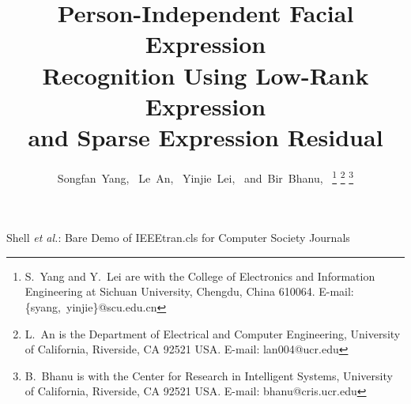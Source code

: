 \documentclass[journal]{IEEEtran}
\begin{document}
%
\title{Person-Independent Facial Expression  \\ Recognition Using Low-Rank Expression \\ and Sparse Expression Residual}
%
%
%

\author{Songfan~Yang,~
				Le~An,~
				Yinjie~Lei,~
        and~Bir~Bhanu,~%
\thanks{S.~Yang and Y.~Lei are with the College of Electronics and Information Engineering at Sichuan University, Chengdu, China 610064. E-mail: \{syang,~yinjie\}@scu.edu.cn}
\thanks{L.~An is the Department of Electrical and Computer Engineering, University of California, Riverside, CA 92521 USA. E-mail: lan004@ucr.edu}
\thanks{B.~Bhanu is with the Center for Research in Intelligent Systems, University of California, Riverside, CA 92521 USA. E-mail: bhanu@cris.ucr.edu}
}


%
{Shell \MakeLowercase{\textit{et al.}}: Bare Demo of
IEEEtran.cls for Computer Society Journals}
\maketitle
\end{document}
